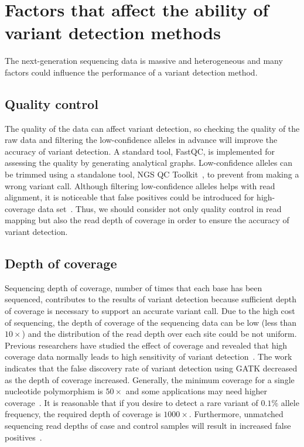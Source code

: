 \documentclass[a4,center,fleqn]{NAR}
\begin{document}
\section{Factors that affect the ability of variant detection methods}

The next-generation sequencing data is massive and heterogeneous and many factors could influence the performance of a variant detection method.
\subsection{Quality control}

The quality of the data can affect variant detection, so checking the quality of the raw data and filtering the low-confidence alleles in advance will improve the accuracy of variant detection.
A standard tool, FastQC, is implemented for assessing the quality by generating analytical graphs.
Low-confidence alleles can be trimmed using a standalone tool, NGS QC Toolkit~\citep{patel2012ngs}, to prevent from making a wrong variant call.
Although filtering low-confidence alleles helps with read alignment, it is noticeable that false positives could be introduced for high-coverage data set~\citep{liu2012steps}.
Thus, we should consider not only quality control in read mapping but also the read depth of coverage in order to ensure the accuracy of variant detection.

\subsection{Depth of coverage}

Sequencing depth of coverage, number of times that each base has been sequenced, contributes to the results of variant detection because sufficient depth of coverage is necessary to support an accurate variant call.
Due to the high cost of sequencing, the depth of coverage of the sequencing data can be low (less than $10\times$) and the distribution of the read depth over each site could be not uniform.
Previous researchers have studied the effect of coverage and revealed that high coverage data normally leads to high sensitivity of variant detection~\citep{neuman2013analysis, krawitz2010microindel, Cheng2014}.
The work ~\citep{liu2013variant} indicates that the false discovery rate of variant detection using GATK decreased as the depth of coverage increased.
Generally, the minimum coverage for a single nucleotide polymorphism is $50\times$ and some applications may need higher coverage~\citep{Schlotterer2014}.
It is reasonable that if you desire to detect a rare variant of $0.1\%$ allele frequency, the required depth of coverage is $1000\times$.
Furthermore, unmatched sequencing read depths of case and control samples will result in increased false positives~\citep{garner2011confounded}.
\end{document}
